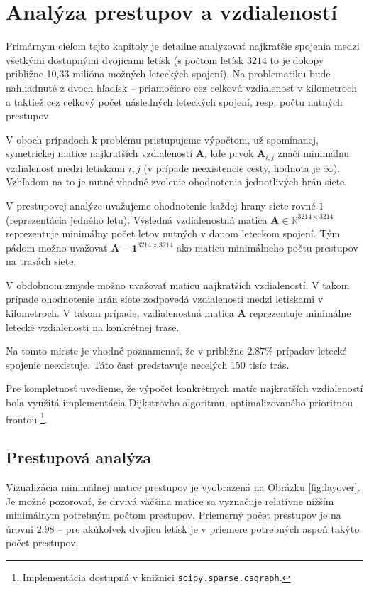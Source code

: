 \chapter[Analýza prestupov a vzdialeností \small{(Marek Šugár)}]{Analýza prestupov a vzdialeností}

Primárnym cieľom tejto kapitoly je detailne analyzovať najkratšie spojenia 
medzi všetkými dostupnými dvojicami letísk (s počtom letísk $3214$ to je dokopy približne 10,33 milióna možných leteckých spojení).
Na problematiku bude nahliadnuté z dvoch hľadísk – priamočiaro cez celkovú vzdialenosť v kilometroch a taktiež cez celkový počet následných
leteckých spojení, resp. počtu nutných prestupov.

V oboch prípadoch k problému pristupujeme výpočtom, už spomínanej, symetrickej matice najkratších vzdialeností $\mathbf{A}$, kde prvok $\mathbf{A}_{i,j}$ značí minimálnu vzdialenosť
medzi letiskami $i, j$ (v prípade neexistencie cesty, hodnota je $\infty$). Vzhľadom na to je nutné vhodné zvolenie ohodnotenia jednotlivých hrán siete. 

V prestupovej analýze uvažujeme ohodnotenie každej hrany siete rovné $1$ (reprezentácia jedného letu). Výsledná vzdialenostná matica $\mathbf{A} \in \mathbb{R}^{3214 \times 3214}$ 
reprezentuje minimálny počet letov nutných v danom leteckom spojení. Tým pádom možno uvažovať $\mathbf{A} - \mathbf{1}^{3214 \times 3214}$ ako maticu minimálneho počtu prestupov na trasách siete.

V obdobnom zmysle možno uvažovať maticu najkratších vzdialeností. V takom prípade ohodnotenie hrán siete zodpovedá vzdialenosti medzi letiskami v kilometroch. V takom prípade, vzdialenostná matica $\mathbf{A}$
reprezentuje minimálne letecké vzdialenosti na konkrétnej trase.

Na tomto mieste je vhodné poznamenať, že v približne $2.87 \%$ prípadov letecké spojenie neexistuje. Táto časť predstavuje necelých $150$ tisíc trás. 

Pre kompletnosť uvedieme, že výpočet konkrétnych matíc najkratších vzdialeností bola využitá implementácia Dijkstrovho algoritmu, optimalizovaného prioritnou frontou \footnote{Implementácia dostupná v knižnici \texttt{scipy.sparse.csgraph}.}.

\section{Prestupová analýza}
Vizualizácia minimálnej matice prestupov je vyobrazená na Obrázku \ref{fig:layover}. Je možné pozorovať, že drvivá väčšina matice sa vyznačuje relatívne nižším minimálnym potrebným počtom prestupov. Priemerný počet prestupov
je na úrovni $2.98$ – pre akúkoľvek dvojicu letísk je v priemere potrebných aspoň takýto počet prestupov.

